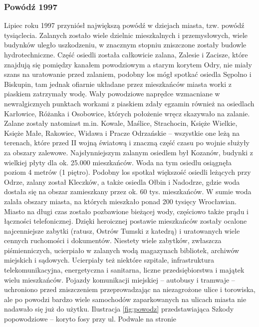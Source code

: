 \documentclass{article}
\begin{document}
\subsubsection{Powódź 1997}
Lipiec roku 1997 przyniósł największą powódź w dziejach miasta, tzw. powódź tysiąclecia. Zalanych zostało wiele dzielnic mieszkalnych i przemysłowych, wiele budynków uległo uszkodzeniu, w znacznym stopniu zniszczone zostały budowle hydrotechniczne. Część osiedli została całkowicie zalana, Zalesie i Zacisze, które znajdują się pomiędzy kanałem powodziowym a starym korytem Odry, nie miały szans na uratowanie przed zalaniem, podobny los mógł spotkać osiedla Sępolno i Biskupin, tam jednak ofiarnie układane przez mieszkańców miasta worki z piaskiem zatrzymały wodę. Wały powodziowe naprędce wzmacniane w newralgicznych punktach workami z piaskiem zdały egzamin również na osiedlach Karłowice, Różanka i Osobowice, których położenie wręcz skazywało na zalanie. Zalane zostały natomiast m.in. Kowale, Maślice, Strachocin, Księże Wielkie, Księże Małe, Rakowiec, Widawa i Pracze Odrzańskie – wszystkie one leżą na terenach, które przed II wojną światową i znaczną część czasu po wojnie służyły za obszary zalewowe. Najsłynniejszym zalanym osiedlem był Kozanów, budynki z wielkiej płyty dla ok. 25.000 mieszkańców. Woda na tym osiedlu osiągnęła poziom 4 metrów (1 piętro). Podobny los spotkał większość osiedli leżących przy Odrze, zalany został Kleczków, a także osiedla Ołbin i Nadodrze, gdzie woda dostała się na obszar zamieszkany przez ok. 60 tys. mieszkańców. W sumie woda zalała obszary miasta, na których mieszkało ponad 200 tysięcy Wrocławian. Miasto na długi czas zostało pozbawione bieżącej wody, częściowo także prądu i łączności telefonicznej. Dzięki heroicznej postawie mieszkańców zostały ocalone najcenniejsze zabytki (ratusz, Ostrów Tumski z katedrą) i uratowanych wiele cennych ruchomości i dokumentów. Niestety wiele zabytków, zwłaszcza piśmienniczych, ucierpiało w zalanych wodą magazynach bibliotek, archiwów miejskich i sądowych. Ucierpiały też niektóre szpitale, infrastruktura telekomunikacyjna, energetyczna i sanitarna, liczne przedsiębiorstwa i majątek wielu mieszkańców. Pojazdy komunikacji miejskiej – autobusy i tramwaje – uchroniono przed zniszczeniem przeprowadzając na niezagrożone ulice i torowiska, ale po powodzi bardzo wiele samochodów zaparkowanych na ulicach miasta nie nadawało się już do użytku.
Ilustracja \ref{fig:powodz} przedstawiająca Szkody popowodziowe – koryto fosy przy ul. Podwale
na stronie \pageref{fig:powodz}
\end{document}
